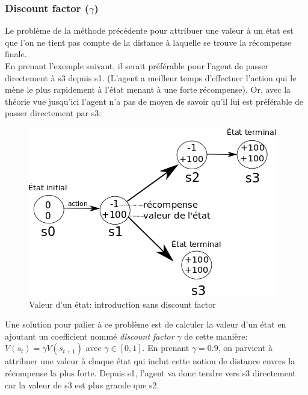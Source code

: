 \documentclass[11pt,a4paper]{report}
\begin{document}
\subsubsection{Discount factor ($\gamma$)}
  
    \par Le problème de la méthode précédente pour attribuer une valeur à un état est que l'on ne tient pas compte de la distance à laquelle se trouve la récompense finale.\\
    En prenant l'exemple suivant, il serait préférable pour l'agent de passer directement à s3 depuis s1. (L'agent a meilleur temps d'effectuer l'action qui le mène le plus rapidement à l'état menant à une forte récompense). Or, avec la théorie vue jusqu'ici l'agent n'a pas de moyen de savoir qu'il lui est préférable de passer directement par s3:
    
    \begin{figure}[!h]
    \center
    \includegraphics[scale=0.60]{ressources/introduction_function_value_3.png}
    \caption{Valeur d'un état: introduction sans discount factor}
    \end{figure}
    
    \par Une solution pour palier à ce problème est de calculer la valeur d'un état en ajoutant un coefficient nommé \textit{discount factor} $\gamma$ de cette manière: $V(s_t) = \gamma V(s_{t+1})$ avec $\gamma \in [0,1]$. En prenant $\gamma = 0.9$, on parvient à attribuer une valeur à chaque état qui inclut cette notion de distance envers la récompense la plus forte. Depuis s1, l'agent va donc tendre vers s3 directement car la valeur de s3 est plus grande que s2.
    
\end{document}
